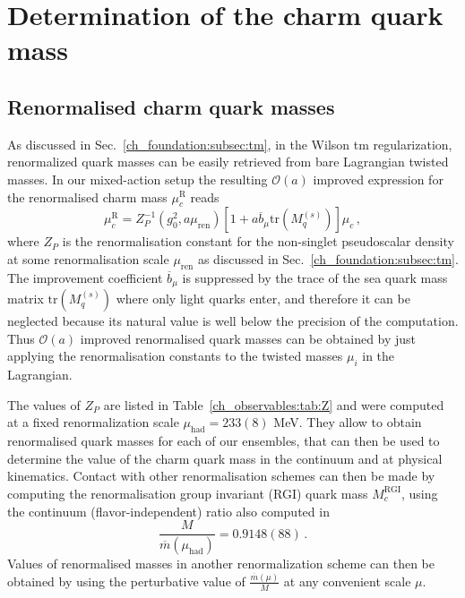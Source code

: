 
\section{Determination of the charm quark mass}
\label{sec:mc}

\subsection{Renormalised charm quark masses}

%
As discussed in Sec.~\ref{ch_foundation:subsec:tm}, in the Wilson tm regularization, renormalized quark masses can be easily retrieved from bare Lagrangian twisted masses. In our mixed-action setup the resulting $\mathcal{O}(a)$ improved expression for the renormalised  charm mass $\mu^{\textrm{R}}_c$ reads
\begin{equation}
	\mu^{\textrm{R}}_c=Z_P^{-1}(g_0^2,a\mu_{\textrm{ren}})\left[1+a\overline{b}_\mu\textrm{tr}\left(M_q^{(s)}\right)\right]\mu_c\,,
	\label{eq:renormalised_charm_mass}
\end{equation}
where $Z_P$ is the renormalisation constant for the non-singlet
pseudoscalar density at some renormalisation scale $\mu_{\textrm{ren}}$ as discussed in Sec.~\ref{ch_foundation:subsec:tm}.
%
The improvement coefficient $\overline{b}_{\mu}$ is suppressed by the trace of the sea quark mass matrix $\textrm{tr}\left(M_q^{(s)}\right)$ where only light quarks enter, and therefore it can be neglected because its natural value is well below the precision of the computation. Thus $\mathcal{O}(a)$ improved renormalised quark masses can be obtained by just applying the renormalisation constants to the twisted masses $\mu_i$ in the Lagrangian.
%

The values of $Z_P$ are listed in Table~\ref{ch_observables:tab:Z} and were computed at a fixed renormalization scale $\mu_{\textrm{had}}=233(8)$ MeV. They allow to obtain renormalised quark masses for each of our ensembles, that can then
be used to determine the value of the charm quark mass in the continuum and at physical kinematics.
%
Contact with other renormalisation schemes can then be made by computing the renormalisation
group invariant (RGI) quark mass $M_c^{\mathrm{RGI}}$, using the continuum (flavor-independent)
ratio also computed in~\cite{Campos:2018ahf}
\begin{equation}
	\frac{M}{\overline{m}(\mu_{\mathrm{had}})} = 0.9148(88)\,.
	\label{eq:rgi_running_factor}
\end{equation}
%
Values of renormalised masses in another renormalization scheme can then be obtained by
using the perturbative value of $\frac{\overline{m}(\mu)}{M}$ at any convenient scale $\mu$.
%

